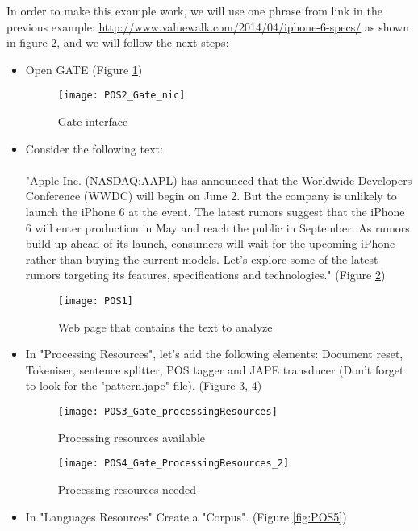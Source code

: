 In order to make this example work, we will use one phrase from link in the previous example: \url{http://www.valuewalk.com/2014/04/iphone-6-specs/} as shown in figure \ref{fig:POS1}, and we will follow the next steps:
	\begin{itemize}
		\item Open GATE (Figure \ref{fig:POS2})
		
			\begin{figure}\centering
				\texttt{[image: POS2\_Gate\_nic]}
				\caption{Gate interface}\label{fig:POS2}
			\end{figure}
		
		\item Consider the following text: \\\\"Apple Inc. (NASDAQ:AAPL) has announced that the Worldwide Developers Conference (WWDC) will begin on June 2. But the company is unlikely to launch the iPhone 6 at the event. The latest rumors suggest that the iPhone 6 will enter production in May and reach the public in September. As rumors build up ahead of its launch, consumers will wait for the upcoming iPhone rather than buying the current models. Let’s explore some of the latest rumors targeting its features, specifications and technologies." (Figure \ref{fig:POS1})
		
			\begin{figure}\centering
				\texttt{[image: POS1]}
				\caption{Web page that contains the text to analyze}\label{fig:POS1}
			\end{figure}
		
		\item In "Processing Resources", let's add the following elements: Document reset, Tokeniser, sentence splitter, POS tagger and JAPE transducer (Don't forget to look for the "pattern.jape" file). (Figure \ref{fig:POS3}, \ref{fig:POS4})
		
			\begin{figure}\centering
				\texttt{[image: POS3\_Gate\_processingResources]}
				\caption{Processing resources available}\label{fig:POS3}
			\end{figure}

			\begin{figure}\centering
				\texttt{[image: POS4\_Gate\_ProcessingResources\_2]}
				\caption{Processing resources needed}\label{fig:POS4}
			\end{figure}
		
		\item In "Languages Resources" Create a "Corpus". (Figure \ref{fig:POS5})
		

\end{itemize}
